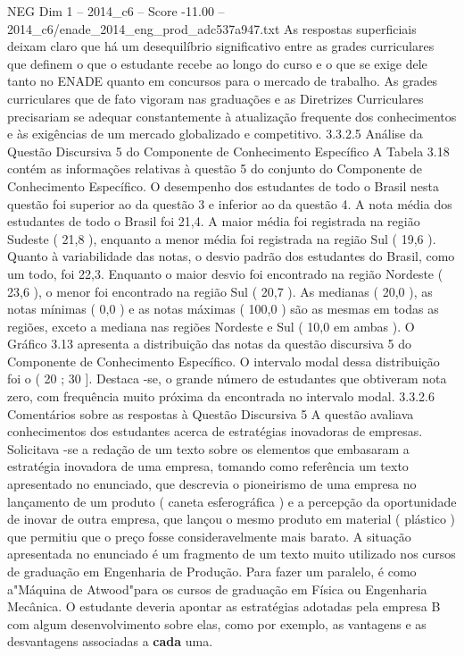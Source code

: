 \begin{textsample}{NEG Dim 1 – 2014\_c6 – Score -11.00 – 2014\_c6/enade\_2014\_eng\_prod\_adc537a947.txt}
As respostas superficiais deixam claro que há um desequilíbrio significativo entre as grades curriculares que definem o que o estudante recebe ao longo do curso e o que se exige dele tanto no ENADE quanto em concursos para o mercado de trabalho.
As grades curriculares que de fato vigoram nas graduações e as Diretrizes Curriculares precisariam se adequar constantemente à atualização frequente dos conhecimentos e às exigências de um mercado globalizado e competitivo. 3.3.2.5 Análise da Questão Discursiva 5 do Componente de Conhecimento Específico A Tabela 3.18 contém as informações relativas à questão 5 do conjunto do Componente de Conhecimento Específico.
O desempenho dos estudantes de todo o Brasil nesta questão foi superior ao da questão 3 e inferior ao da questão 4.
A nota média dos estudantes de todo o Brasil foi 21,4.
A maior média foi registrada na região Sudeste ( 21,8 ), enquanto a menor média foi registrada na região Sul ( 19,6 ).
Quanto à variabilidade das notas, o desvio padrão dos estudantes do Brasil, como um todo, foi 22,3.
Enquanto o maior desvio foi encontrado na região Nordeste ( 23,6 ), o menor foi encontrado na região Sul ( 20,7 ).
As medianas ( 20,0 ), as notas mínimas ( 0,0 ) e as notas máximas ( 100,0 ) são as mesmas em todas as regiões, exceto a mediana nas regiões Nordeste e Sul ( 10,0 em ambas ).
O Gráfico 3.13 apresenta a distribuição das notas da questão discursiva 5 do Componente de Conhecimento Específico.
O intervalo modal dessa distribuição foi o ( 20 ; 30 ].
Destaca -se, o grande número de estudantes que obtiveram nota zero, com frequência muito próxima da encontrada no intervalo modal. 3.3.2.6 Comentários sobre as respostas à Questão Discursiva 5 A questão avaliava conhecimentos dos estudantes acerca de estratégias inovadoras de empresas.
Solicitava -se a redação de um texto sobre os elementos que embasaram a estratégia inovadora de uma empresa, tomando como referência um texto apresentado no enunciado, que descrevia o pioneirismo de uma empresa no lançamento de um produto ( caneta esferográfica ) e a percepção da oportunidade de inovar de outra empresa, que lançou o mesmo produto em material ( plástico ) que permitiu que o preço fosse consideravelmente mais barato.
A situação apresentada no enunciado é um fragmento de um texto muito utilizado nos cursos de graduação em Engenharia de Produção.
Para fazer um paralelo, é como a"Máquina de Atwood"para os cursos de graduação em Física ou Engenharia Mecânica.
O estudante deveria apontar as estratégias adotadas pela empresa B com algum desenvolvimento sobre elas, como por exemplo, as vantagens e as desvantagens associadas a \textbf{cada} uma.

\end{textsample}
